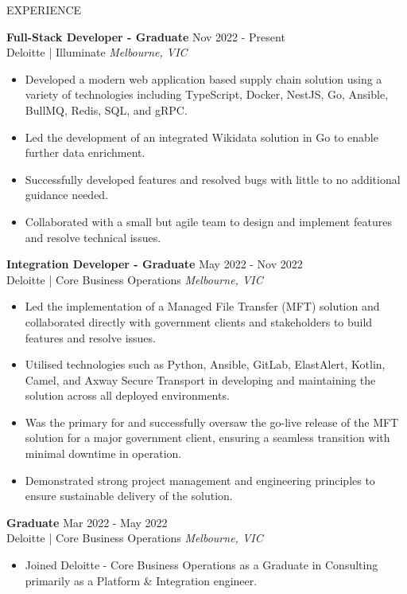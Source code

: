 \documentclass{resume} %
\begin{document}
\begin{rSection}{EXPERIENCE}

\textbf{Full-Stack Developer - Graduate} \hfill Nov 2022 - Present\\
Deloitte | Illuminate \hfill \textit{Melbourne, VIC}
 \begin{itemize}
    \itemsep -3pt {} 
    \item Developed a modern web application based supply chain solution using a variety of technologies including TypeScript, Docker, NestJS, Go, Ansible, BullMQ, Redis, SQL, and gRPC.
    \item Led the development of an integrated Wikidata solution in Go to enable further data enrichment.
    \item Successfully developed features and resolved bugs with little to no additional guidance needed.
    \item Collaborated with a small but agile team to design and implement features and resolve technical issues.
 \end{itemize}
 
\textbf{Integration Developer - Graduate} \hfill May 2022 - Nov 2022\\
Deloitte | Core Business Operations \hfill \textit{Melbourne, VIC}
 \begin{itemize}
    \itemsep -3pt {} 
    \item Led the implementation of a Managed File Transfer (MFT) solution and collaborated directly with government clients and stakeholders to build features and resolve issues.
    \item Utilised technologies such as Python, Ansible, GitLab, ElastAlert, Kotlin, Camel, and Axway Secure Transport in developing and maintaining the solution across all deployed environments.
    \item Was the primary for and successfully oversaw the go-live release of the MFT solution for a major government client, ensuring a seamless transition with minimal downtime in operation.
    \item Demonstrated strong project management and engineering principles to ensure sustainable delivery of the solution.
 \end{itemize}

 \textbf{Graduate} \hfill Mar 2022 - May 2022\\
Deloitte | Core Business Operations \hfill \textit{Melbourne, VIC}
 \begin{itemize}
    \itemsep -3pt {} 
    \item Joined Deloitte - Core Business Operations as a Graduate in Consulting primarily as a Platform \& Integration engineer.
 \end{itemize}


\end{rSection}
\end{document}
